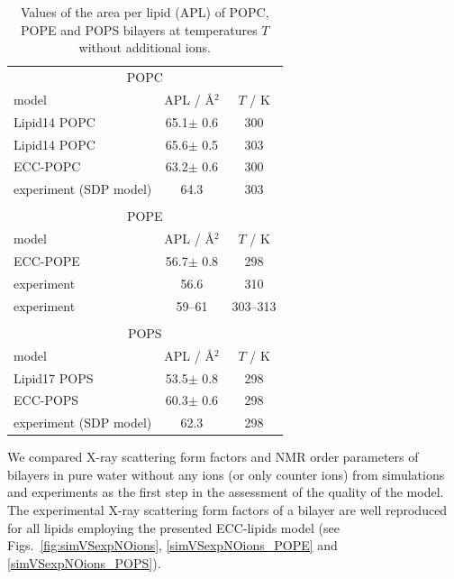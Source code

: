 \begin{table}[tb!] 
\centering
  \caption{Values of the area per lipid (APL) of POPC, POPE and POPS bilayers 
           at temperatures $T$ without additional ions. \label{tab:apls} } 
  \begin{tabular}{l|c c} 
    \multicolumn{3}{c}{POPC} \\
    model          & APL / Å$^2$   & $T$ / K  \\ 
    \hline 
    Lipid14 POPC \citep{melcr18}    & 65.1$\pm$ 0.6  &  300 \\ 
    Lipid14 POPC \citep{dickson14}  & 65.6$\pm$ 0.5  &  303 \\ 
    \hline 
    ECC-POPC     \citep{melcr18}    & 63.2$\pm$ 0.6  &  300       \\ 
    \hline 
    experiment (SDP model) \citep{kucerka11} & 64.3  &  303    \\ 
    \hline 
    \multicolumn{3}{c}{} \\
    \multicolumn{3}{c}{POPE} \\
    model          & APL / Å$^2$   & $T$ / K  \\ 
    \hline 
    ECC-POPE                 & 56.7$\pm$ 0.8  &  298 \\ 
    \hline 
    experiment   \citep{parsegian89} & 56.6  &  310    \\ 
    experiment   \citep{rappolt03}   & 59--61 &  303--313  \\ 
    \hline 
    \multicolumn{3}{c}{} \\
    \multicolumn{3}{c}{POPS} \\
    model          & APL / Å$^2$   & $T$ / K  \\ 
    \hline 
    Lipid17 POPS              & 53.5$\pm$ 0.8  &  298 \\ 
    \hline 
    ECC-POPS                & 60.3$\pm$ 0.6  &  298       \\ 
    \hline 
    experiment (SDP model) \citep{kucerka14} & 62.3  &  298    \\ 
    \hline 
  \end{tabular} 
\end{table} 
 
 
We compared X-ray scattering form factors and NMR order parameters of bilayers
in pure water without any ions (or only counter ions)
from simulations and experiments
as the first step in the assessment of the quality of the model. 
The experimental X-ray scattering form factors 
of a bilayer are well reproduced for all lipids employing the presented ECC-lipids model 
(see Figs.~\ref{fig:simVSexpNOions}, \ref{simVSexpNOions_POPE} and \ref{simVSexpNOions_POPS}). 

